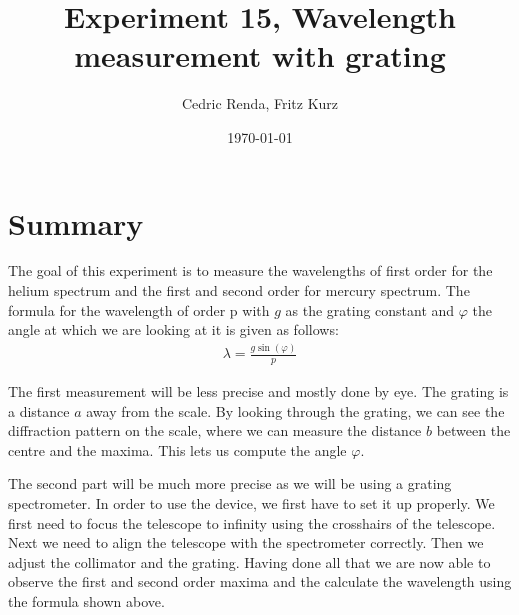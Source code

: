 \documentclass[12pt,a4paper]{article}
\title{Experiment 15, Wavelength measurement with grating}
\author{Cedric Renda, Fritz Kurz}
\date{\today }
\begin{document}
	
	\maketitle
	\section{Summary}
	The goal of this experiment is to measure the wavelengths of first order for the helium spectrum and the first and second order for mercury spectrum.
	The formula for the wavelength of order p with $g$ as the grating constant and $\varphi$ the angle at which we are looking at it is given as follows:
	\begin{align*}
		\lambda = \frac{g \sin(\varphi)}{p}
	\end{align*}
	
	The first measurement will be less precise and mostly done by eye. 
	The grating is a distance $a$ away from the scale.
	By looking through the grating, we can see the diffraction pattern on the scale, where we can measure the distance $b$ between the centre and the maxima. 
	This lets us compute the angle $\varphi$. 
	
	The second part will be much more precise as we will be using a grating spectrometer.
	In order to use the device, we first have to set it up properly.
	We first need to focus the telescope to infinity using the crosshairs of the telescope.
	Next we need to align the telescope with the spectrometer correctly. 
	Then we adjust the collimator and the grating.
	Having done all that we are now able to observe the first and second order maxima and the calculate the wavelength using the formula shown above. 

	
	
\end{document}
